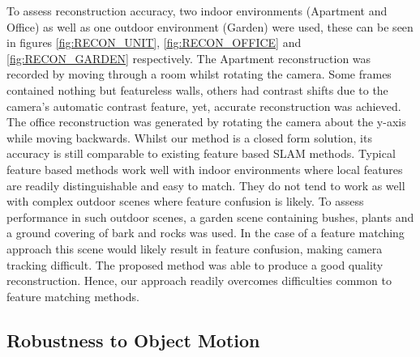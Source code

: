 To assess reconstruction accuracy, two indoor environments (Apartment and Office) as well as one outdoor environment (Garden) were used, these can be seen in figures \ref{fig:RECON_UNIT}, \ref{fig:RECON_OFFICE} and \ref{fig:RECON_GARDEN} respectively. The Apartment reconstruction was recorded by moving through a room whilst rotating the camera. Some frames contained nothing but featureless walls, others had contrast shifts due to the camera's automatic contrast feature, yet, accurate reconstruction was achieved. The office reconstruction was generated by rotating the camera about the y-axis while moving backwards. Whilst our method is a closed form solution, its accuracy is still comparable to existing feature based SLAM methods. Typical feature based methods work well with indoor environments where local features are readily distinguishable and easy to match. They do not tend to work as well with complex outdoor scenes where feature confusion is likely. To assess performance in such outdoor scenes, a garden scene containing bushes, plants and a ground covering of bark and rocks was used. In the case of a feature matching approach this scene would likely result in feature confusion, making camera tracking difficult. The proposed method was able to produce a good quality reconstruction. Hence, our approach readily overcomes difficulties common to feature matching methods.             




\subsection{Robustness to Object Motion}


